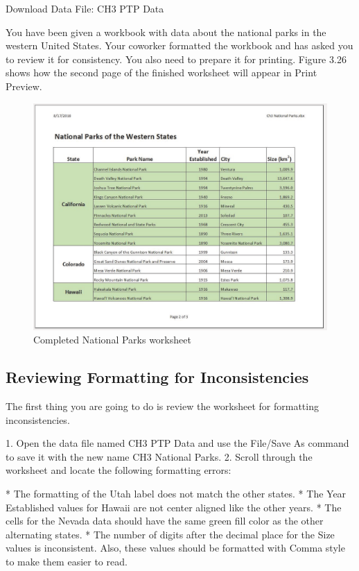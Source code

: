 Download Data File: CH3 PTP Data

You have been given a workbook with data about the national parks in the western United States.
Your coworker formatted the workbook and has asked you to review it for consistency. You also need
to prepare it for printing. Figure 3.26 shows how the second page of the finished worksheet will
appear in Print Preview.



\begin{figure}[H]
	\centering
	\includegraphics[width=\maxwidth{.95\linewidth}]{gfx/ch03_fig26}
	\caption{Completed National Parks worksheet}
	\label{03:fig26}
\end{figure}



\subsection{Reviewing Formatting for Inconsistencies}

The first thing you are going to do is review the worksheet for formatting inconsistencies.

1. Open the data file named CH3 PTP Data and use the File/Save As command to save it with the
new name CH3 National Parks.
2. Scroll through the worksheet and locate the following formatting errors:

* The formatting of the Utah label does not match the other states.
* The Year Established values for Hawaii are not center aligned like the other years.
* The cells for the Nevada data should have the same green fill color as the other alternating
states.
* The number of digits after the decimal place for the Size values is inconsistent. Also, these
values should be formatted with Comma style to make them easier to read.

